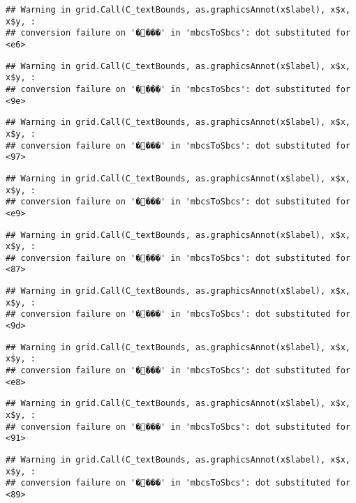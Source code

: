 \documentclass[
]{article}
\begin{document}
\begin{verbatim}
## Warning in grid.Call(C_textBounds, as.graphicsAnnot(x$label), x$x, x$y, :
## conversion failure on '����' in 'mbcsToSbcs': dot substituted for <e6>
\end{verbatim}

\begin{verbatim}
## Warning in grid.Call(C_textBounds, as.graphicsAnnot(x$label), x$x, x$y, :
## conversion failure on '����' in 'mbcsToSbcs': dot substituted for <9e>
\end{verbatim}

\begin{verbatim}
## Warning in grid.Call(C_textBounds, as.graphicsAnnot(x$label), x$x, x$y, :
## conversion failure on '����' in 'mbcsToSbcs': dot substituted for <97>
\end{verbatim}

\begin{verbatim}
## Warning in grid.Call(C_textBounds, as.graphicsAnnot(x$label), x$x, x$y, :
## conversion failure on '����' in 'mbcsToSbcs': dot substituted for <e9>
\end{verbatim}

\begin{verbatim}
## Warning in grid.Call(C_textBounds, as.graphicsAnnot(x$label), x$x, x$y, :
## conversion failure on '����' in 'mbcsToSbcs': dot substituted for <87>
\end{verbatim}

\begin{verbatim}
## Warning in grid.Call(C_textBounds, as.graphicsAnnot(x$label), x$x, x$y, :
## conversion failure on '����' in 'mbcsToSbcs': dot substituted for <9d>
\end{verbatim}

\begin{verbatim}
## Warning in grid.Call(C_textBounds, as.graphicsAnnot(x$label), x$x, x$y, :
## conversion failure on '����' in 'mbcsToSbcs': dot substituted for <e8>
\end{verbatim}

\begin{verbatim}
## Warning in grid.Call(C_textBounds, as.graphicsAnnot(x$label), x$x, x$y, :
## conversion failure on '����' in 'mbcsToSbcs': dot substituted for <91>
\end{verbatim}

\begin{verbatim}
## Warning in grid.Call(C_textBounds, as.graphicsAnnot(x$label), x$x, x$y, :
## conversion failure on '����' in 'mbcsToSbcs': dot substituted for <89>
\end{verbatim}
\end{document}
